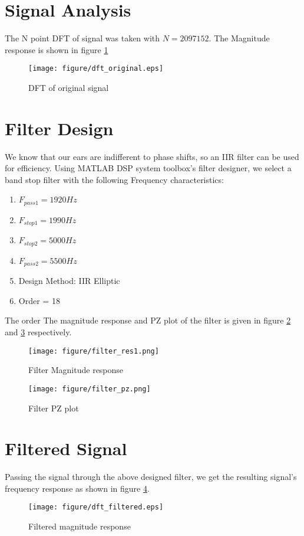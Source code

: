 \documentclass[12pt,letterpaper]{article}
\begin{document}
\section*{Signal Analysis}
The N point DFT of signal was taken with $N = 2097152$. The Magnitude response is shown in figure \ref{f1}

\begin{figure}[!h]
    \centering
    \texttt{[image: figure/dft\_original.eps]}
    \caption{DFT of original signal}
    \label{f1}
\end{figure}

\section*{Filter Design}
We know that our ears are indifferent to phase shifts, so an IIR filter can be used for efficiency. Using MATLAB DSP system toolbox's filter designer, we select a band stop filter with the following Frequency characteristics: 
\begin{enumerate}
    \item $F_{pass1} = 1920 Hz$
    \item $F_{stop1} = 1990 Hz$
    \item $F_{stop2} = 5000 Hz$
    \item $F_{pass2} = 5500 Hz$
    \item Design Method: IIR Elliptic
    \item Order = 18
\end{enumerate}
The order 
The magnitude response and PZ plot of the filter is given in figure \ref{f2} and \ref{f3} respectively. 

\begin{figure}[!h]
    \centering
    \texttt{[image: figure/filter\_res1.png]}
    \caption{Filter Magnitude response}
    \label{f2}
\end{figure}
\begin{figure}[!h]
    \centering
    \texttt{[image: figure/filter\_pz.png]}
    \caption{Filter PZ plot}
    \label{f3}
\end{figure}

\section*{Filtered Signal}
Passing the signal through the above designed filter, we get the resulting signal's frequency response as shown in figure \ref{f4}.

\begin{figure}[!h]
    \centering
    \texttt{[image: figure/dft\_filtered.eps]}
    \caption{Filtered magnitude response}
    \label{f4}
\end{figure}
\end{document}

